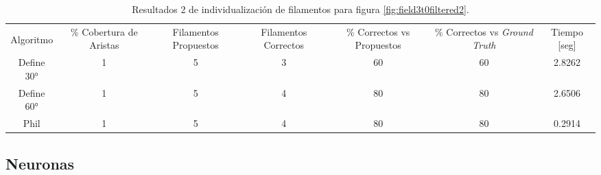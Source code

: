 \begin{table}[h]
    \centering
    \begin{tabular}{|c|c|c|c|c|c|c|}
    \hline
         & \multirow{4}{2cm}{\centering \% Cobertura de Aristas} & \multirow{4}{2cm}{Filamentos Propuestos} & \multirow{4}{2cm}{Filamentos Correctos} & \multirow{4}{2.5cm}{\% Correctos vs Propuestos} & \multirow{4}{2.5cm}{\centering \% Correctos vs {\it Ground Truth}} & \multirow{4}{1.2cm}{\centering Tiempo [seg]} \\
         &  &  &  & & &  \\
        Algoritmo &  &  &  & & &  \\
        &  &  &  & & &  \\ \hline
        Define 30° & 1 & 5 & 3 & 60 & 60 & 2.8262\\
        Define 60° & 1 & 5 & 4 & 80 & 80 & 2.6506\\ 
        Phil & 1 & 5 & 4 & 80 & 80 & 0.2914\\
        \hline
    \end{tabular}
    \caption{Resultados 2 de individualizaci\'on de filamentos para figura \ref{fig:field3t0filtered2}.}
    \label{tab:field3t0filtered2-2}
\end{table}

\subsection{Neuronas}